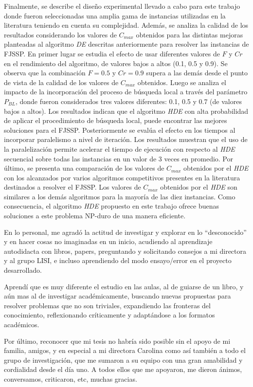 Finalmente, se describe el diseño experimental llevado a cabo para este trabajo donde fueron seleccionadas una amplia gama de instancias utilizadas en la literatura teniendo en cuenta su complejidad. Además, se analiza la calidad de los resultados considerando los valores de $ C_ {max} $ obtenidos para las distintas mejoras planteadas al algoritmo \textit{DE} descritas anteriormente para resolver las instancias de FJSSP. En primer lugar se estudia  el efecto de usar diferentes valores de $F$ y $Cr$ en el rendimiento del algoritmo, de valores bajos a altos (0.1, 0.5 y 0.9). Se observa que la combinación $F = 0.5 $ y $Cr = 0.9 $ supera a las demás desde el punto de vista de la calidad de los valores de $ C_ {max} $ obtenidos. 
Luego se analiza el impacto de la incorporación del proceso de búsqueda local a través del parámetro $P_{BL}$, donde fueron considerados tres valores diferentes: 0.1, 0.5 y 0.7 (de valores bajos a altos). Los resultados indican que el algoritmo \textit{HDE} con alta probabilidad de aplicar el procedimiento de búsqueda local, puede encontrar las mejores soluciones para el FJSSP. 
Posteriormente se evalúa el efecto en los tiempos al incorporar paralelismo a nivel de iteración. Los resultados muestran que el uso de la paralelización permite acelerar el tiempo de ejecución con respecto al \textit{HDE} secuencial sobre todas las instancias en un valor de 3 veces en promedio.
Por último, se presenta una comparación de los valores de $C_{max}$ obtenidos por el \textit{HDE} con los alcanzados por varios algoritmos competitivos presentes en la literatura destinados a resolver el FJSSP. Los valores de $C_{max}$ obtenidos por el \textit{HDE} son similares a los demás algoritmos para la mayoría de las diez instancias. Como consecuencia, el algoritmo \textit{HDE} propuesto en este trabajo ofrece buenas soluciones a este problema NP-duro de una manera eficiente.


En lo personal, me agradó la actitud de investigar y explorar en lo “desconocido” y en hacer cosas no imaginadas en un inicio, acudiendo al aprendizaje autodidacta con libros, papers, preguntando y solicitando consejos a mi directora y al grupo LISI, e incluso aprendiendo del modo ensayo/error en el proyecto desarrollado.


Aprendí que es muy diferente el estudio en las aulas, al de guiarse de un libro, y aún mas al de investigar académicamente, buscando nuevas propuestas para resolver problemas que no son triviales, expandiendo las fronteras del conocimiento, reflexionando críticamente y adaptándose a los formatos académicos.


Por último, reconocer que mi tesis no habría sido posible sin el apoyo de mi familia, amigos, y en especial a mi directora Carolina como así también a todo el grupo de investigación, que me sumaron a su equipo con una gran amabilidad y cordialidad desde el día uno. A todos ellos que me apoyaron, me dieron ánimos, conversamos, criticaron, etc, muchas gracias.
